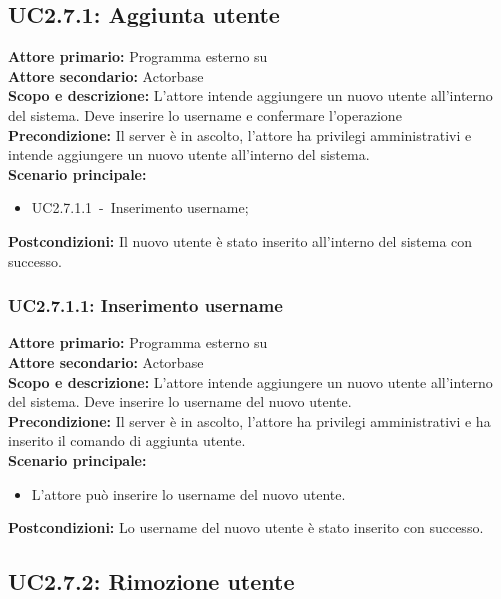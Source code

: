 \documentclass{scalatekids-article}
\begin{document}
\subsection{UC2.7.1: Aggiunta utente}

\textbf{Attore primario:} Programma esterno su \\
\textbf{Attore secondario:} Actorbase\\
\textbf{Scopo e descrizione:} L'attore intende aggiungere un nuovo utente all'interno del sistema. Deve inserire lo username e confermare l'operazione\\
\textbf{Precondizione:} Il server è in ascolto, l'attore ha privilegi amministrativi e intende aggiungere un nuovo utente all'interno del sistema.\\
\textbf{Scenario principale:}
\begin{itemize}
\item UC2.7.1.1\ -\ Inserimento username;
\end{itemize}
\textbf{Postcondizioni:} Il nuovo utente è stato inserito all'interno del sistema con successo.

\subsubsection{UC2.7.1.1: Inserimento username}

\textbf{Attore primario:} Programma esterno su \\
\textbf{Attore secondario:} Actorbase\\
\textbf{Scopo e descrizione:} L'attore intende aggiungere un nuovo utente all'interno del sistema. Deve inserire lo username del nuovo utente.\\
\textbf{Precondizione:} Il server è in ascolto, l'attore ha privilegi amministrativi e ha inserito il comando di aggiunta utente.\\
\textbf{Scenario principale:}
\begin{itemize}
\item L'attore può inserire lo username del nuovo utente.
\end{itemize}
\textbf{Postcondizioni:} Lo username del nuovo utente è stato inserito con successo.

\subsection{UC2.7.2: Rimozione utente}
\end{document}
